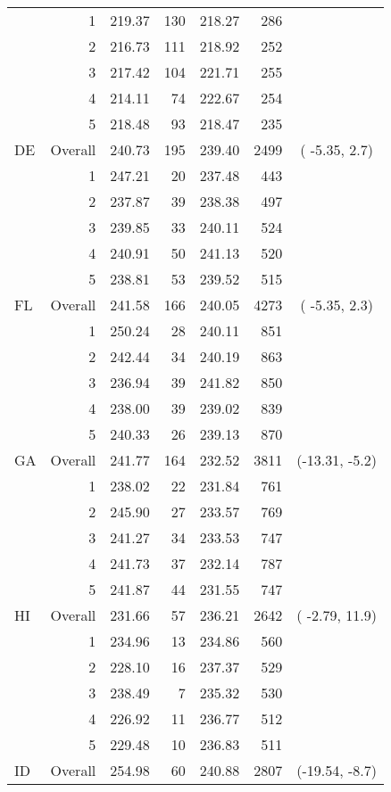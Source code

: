 \begin{longtable}{lrrr@{\extracolsep{.25cm}}rrc}
   & 1 & 219.37 & 130 & 218.27 & 286 &  \\ 
   & 2 & 216.73 & 111 & 218.92 & 252 &  \\ 
   & 3 & 217.42 & 104 & 221.71 & 255 &  \\ 
   & 4 & 214.11 &  74 & 222.67 & 254 &  \\ 
   & 5 & 218.48 &  93 & 218.47 & 235 &  \\ 
   \hline
DE & Overall & 240.73 & 195 & 239.40 & 2499 & ( -5.35,  2.7) \\ 
   & 1 & 247.21 &  20 & 237.48 & 443 &  \\ 
   & 2 & 237.87 &  39 & 238.38 & 497 &  \\ 
   & 3 & 239.85 &  33 & 240.11 & 524 &  \\ 
   & 4 & 240.91 &  50 & 241.13 & 520 &  \\ 
   & 5 & 238.81 &  53 & 239.52 & 515 &  \\ 
   \hline
FL & Overall & 241.58 & 166 & 240.05 & 4273 & ( -5.35,  2.3) \\ 
   & 1 & 250.24 &  28 & 240.11 & 851 &  \\ 
   & 2 & 242.44 &  34 & 240.19 & 863 &  \\ 
   & 3 & 236.94 &  39 & 241.82 & 850 &  \\ 
   & 4 & 238.00 &  39 & 239.02 & 839 &  \\ 
   & 5 & 240.33 &  26 & 239.13 & 870 &  \\ 
   \hline
GA & Overall & 241.77 & 164 & 232.52 & 3811 & (-13.31, -5.2) \\ 
   & 1 & 238.02 &  22 & 231.84 & 761 &  \\ 
   & 2 & 245.90 &  27 & 233.57 & 769 &  \\ 
   & 3 & 241.27 &  34 & 233.53 & 747 &  \\ 
   & 4 & 241.73 &  37 & 232.14 & 787 &  \\ 
   & 5 & 241.87 &  44 & 231.55 & 747 &  \\ 
   \hline
HI & Overall & 231.66 &  57 & 236.21 & 2642 & ( -2.79, 11.9) \\ 
   & 1 & 234.96 &  13 & 234.86 & 560 &  \\ 
   & 2 & 228.10 &  16 & 237.37 & 529 &  \\ 
   & 3 & 238.49 &   7 & 235.32 & 530 &  \\ 
   & 4 & 226.92 &  11 & 236.77 & 512 &  \\ 
   & 5 & 229.48 &  10 & 236.83 & 511 &  \\ 
   \hline
ID & Overall & 254.98 &  60 & 240.88 & 2807 & (-19.54, -8.7) \\ 

\end{longtable}
